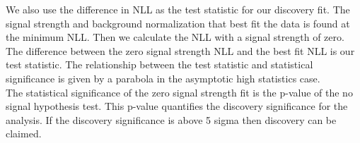 \indent We also use the difference in NLL as the test statistic for our discovery fit.  The signal strength and background normalization that best fit the data is found at the minimum NLL.  Then we calculate the NLL with a signal strength of zero.  The difference between the zero signal strength NLL and the best fit NLL is our test statistic.  The relationship between the test statistic and statistical significance is given by a parabola in the asymptotic high statistics case. \\%

\indent The statistical significance of the zero signal strength fit is the p-value of the no signal hypothesis test.  This p-value quantifies the discovery significance for the analysis.  If the discovery significance is above 5 sigma then discovery can be claimed.\\

